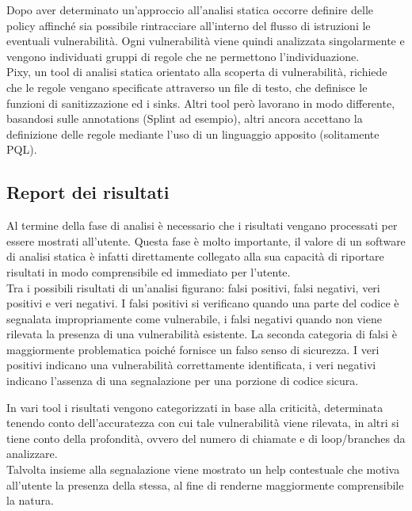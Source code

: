 Dopo aver determinato un'approccio all'analisi statica occorre definire delle policy affinché sia possibile rintracciare all'interno del flusso di istruzioni le eventuali vulnerabilità. Ogni vulnerabilità viene quindi analizzata singolarmente e vengono individuati gruppi di regole che ne permettono l'individuazione.\\
Pixy\cite{pixy}, un tool di analisi statica orientato alla scoperta di vulnerabilità, richiede che le regole vengano specificate attraverso un file di testo, che definisce le funzioni di sanitizzazione ed i sinks. Altri tool però lavorano in modo differente, basandosi sulle annotations (Splint\cite{splint} ad esempio), altri ancora accettano la definizione delle regole mediante l'uso di un linguaggio apposito (solitamente PQL\cite{pql}).

\subsection{Report dei risultati}
Al termine della fase di analisi è necessario che i risultati vengano processati per essere mostrati all'utente. Questa fase è molto importante, il valore di un software di analisi statica è infatti direttamente collegato alla sua capacità di riportare risultati in modo comprensibile ed immediato per l'utente.\\
Tra i possibili risultati di un'analisi figurano: falsi positivi, falsi negativi, veri positivi e veri negativi. I falsi positivi si verificano quando una parte del codice è segnalata impropriamente come vulnerabile, i falsi negativi quando non viene rilevata la presenza di una vulnerabilità esistente. La seconda categoria di falsi è maggiormente problematica poiché fornisce un falso senso di sicurezza. I veri positivi indicano una vulnerabilità correttamente identificata, i veri negativi indicano l'assenza di una segnalazione per una porzione di codice sicura.

In vari tool i risultati vengono categorizzati in base alla criticità, determinata tenendo conto dell'accuratezza con cui tale vulnerabilità viene rilevata, in altri si tiene conto della profondità, ovvero del numero di chiamate e di loop/branches da analizzare.\\
Talvolta insieme alla segnalazione viene mostrato un help contestuale che motiva all'utente la presenza della stessa, al fine di renderne maggiormente comprensibile la natura.